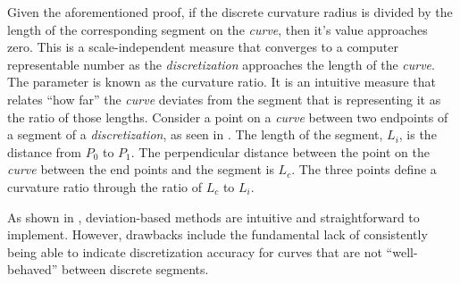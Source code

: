 Given the aforementioned proof, if the discrete curvature radius is
divided by the length of the corresponding segment on the
\textit{curve}, then it’s value approaches zero. This is a
scale-independent measure that converges to a computer representable
number as the \textit{discretization} approaches the length of the
\textit{curve}. The parameter is known as the curvature ratio. It is an
intuitive measure that relates ``how far'' the \textit{curve} deviates
from the segment that is representing it as the ratio of those lengths.
Consider a point on a \textit{curve} between two endpoints of a segment
of a \textit{discretization}, as seen in . The
length of the segment, $L_i$, is the distance from $P_0$ to $P_1$. The
perpendicular distance between the point on the \textit{curve} between
the end points and the segment is $L_c$. The three points define a
curvature ratio through the ratio of $L_c$ to $L_i$.


 As shown in \cite{mclaurin12}, deviation-based methods are
intuitive and straightforward to implement. However, drawbacks include
the fundamental lack of consistently being able to indicate
discretization accuracy for curves that are not ``well-behaved'' between
discrete segments.
